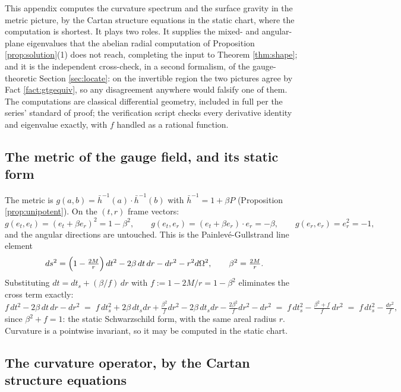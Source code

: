 \documentclass[11pt]{article}
\theoremstyle{definition}
\newcommand{\hb}{\bar{h}}
\newcommand{\er}{e_r}
\newcommand{\et}{e_t}
\begin{document}
This appendix computes the curvature spectrum and the surface gravity in the metric picture, by the Cartan structure equations in the static chart, where the computation is shortest. It plays two roles. It supplies the mixed- and angular-plane eigenvalues that the abelian radial computation of Proposition \ref{prop:solution}(1) does not reach, completing the input to Theorem \ref{thm:shape}; and it is the independent cross-check, in a second formalism, of the gauge-theoretic Section \ref{sec:locate}: on the invertible region the two pictures agree by Fact \ref{fact:gtgequiv}, so any disagreement anywhere would falsify one of them. The computations are classical differential geometry, included in full per the series' standard of proof; the verification script checks every derivative identity and eigenvalue exactly, with $f$ handled as a rational function.

\subsection{The metric of the gauge field, and its static form}\label{app:metric}

The metric is $g(a,b) = \hb^{-1}(a) \cdot \hb^{-1}(b)$ with $\hb^{-1} = 1 + \beta P$ (Proposition \ref{prop:unipotent}). On the $(t,r)$ frame vectors:
\[
g(\et, \et) = (\et + \beta\er)^2 = 1 - \beta^2, \qquad
g(\et, \er) = (\et + \beta\er)\cdot\er = -\beta, \qquad
g(\er, \er) = \er^2 = -1 ,
\]
and the angular directions are untouched. This is the Painlev\'e-Gullstrand line element
\[
ds^2 = \Bigl(1 - \tfrac{2M}{r}\Bigr)\,dt^2 - 2\beta\,dt\,dr - dr^2 - r^2 d\Omega^2 , \qquad \beta^2 = \tfrac{2M}{r} .
\]
Substituting $dt = dt_s + (\beta/f)\,dr$ with $f := 1 - 2M/r = 1 - \beta^2$ eliminates the cross term exactly:
\[
f\,dt^2 - 2\beta\,dt\,dr - dr^2
\;=\; f\,dt_s^2 + 2\beta\,dt_s dr + \tfrac{\beta^2}{f}dr^2 - 2\beta\,dt_s dr - \tfrac{2\beta^2}{f}dr^2 - dr^2
\;=\; f\,dt_s^2 - \tfrac{\beta^2 + f}{f}\,dr^2
\;=\; f\,dt_s^2 - \tfrac{dr^2}{f} ,
\]
since $\beta^2 + f = 1$: the static Schwarzschild form, with the same areal radius $r$. Curvature is a pointwise invariant, so it may be computed in the static chart.

\subsection{The curvature operator, by the Cartan structure equations}\label{app:curvature}
\end{document}
